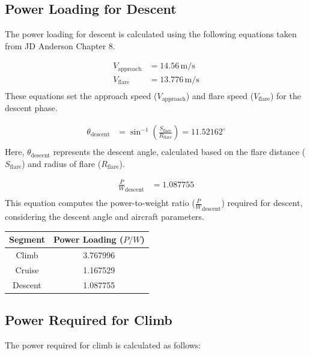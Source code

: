 \documentclass[12 pt]{article}
\begin{document}
\subsection{{Power Loading for Descent}}

The power loading for descent is calculated using the following equations taken from JD Anderson Chapter 8.

\begin{align*}
V_{\text{approach}} &= 14.56 \, \text{m/s} \tag{3.20} \\
V_{\text{flare}} &= 13.776 \, \text{m/s} \tag{3.21} \\
\end{align*}
These equations set the approach speed ($V_{\text{approach}}$) and flare speed ($V_{\text{flare}}$) for the descent phase.

\begin{align*}
\theta_{\text{descent}} &= \sin^{-1}\left(\frac{S_{\text{flare}}}{R_{\text{flare}}}\right) = 11.52162^\circ \tag{3.22} \\
\end{align*}
Here, $\theta_{\text{descent}}$ represents the descent angle, calculated based on the flare distance ($S_{\text{flare}}$) and radius of flare ($R_{\text{flare}}$).

\begin{align*}
\frac{P}{W}_{\text{descent}} &= 1.087755 \tag{3.23} \\
\end{align*}
This equation computes the power-to-weight ratio ($\frac{P}{W}_{\text{descent}}$) required for descent, considering the descent angle and aircraft parameters.

\begin{center}
\begin{tabular}{|c|c|}
\hline
Segment & Power Loading ($P/W$) \\
\hline
Climb & 3.767996 \\
Cruise & 1.167529 \\
Descent & 1.087755 \\
\hline
\end{tabular}
\end{center}

\subsection{{Power Required for Climb}}

The power required for climb is calculated as follows:
\end{document}
